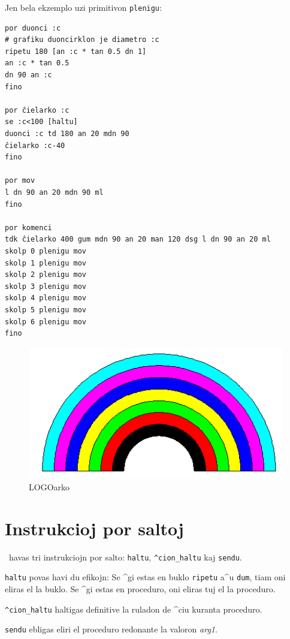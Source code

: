 Jen bela ekzemplo uzi primitivon \texttt{plenigu}:
\begin{verbatim}
por duonci :c
# grafiku duoncirklon je diametro :c
ripetu 180 [an :c * tan 0.5 dn 1]
an :c * tan 0.5
dn 90 an :c
fino

por ĉielarko :c
se :c<100 [haltu]
duonci :c td 180 an 20 mdn 90
ĉielarko :c-40
fino

por mov
l dn 90 an 20 mdn 90 ml
fino

por komenci
tdk ĉielarko 400 gum mdn 90 an 20 man 120 dsg l dn 90 an 20 ml
skolp 0 plenigu mov 
skolp 1 plenigu mov
skolp 2 plenigu mov
skolp 3 plenigu mov
skolp 4 plenigu mov
skolp 5 plenigu mov
skolp 6 plenigu mov
fino
\end{verbatim} 

\begin{figure}
  \includegraphics*{bildoj/arc.png}
  \caption{LOGOarko}
\end{figure} 

\section{Instrukcioj por saltoj}

\xlogo\ havas tri instrukciojn por salto: \texttt{haltu},
\texttt{^cion\_haltu} kaj \texttt{sendu}.


\texttt{haltu} povas havi du efikojn: Se ^gi estas en buklo
\texttt{ripetu} a^u \texttt{dum}, tiam oni eliras el la buklo.  Se ^gi
estas en proceduro, oni eliras tuj el la proceduro.


\texttt{^cion\_haltu} haltigas definitive la ruladon de ^ciu kuranta
proceduro.


\texttt{sendu} ebligas eliri el proceduro redonante la valoron
\textit{arg1}.

